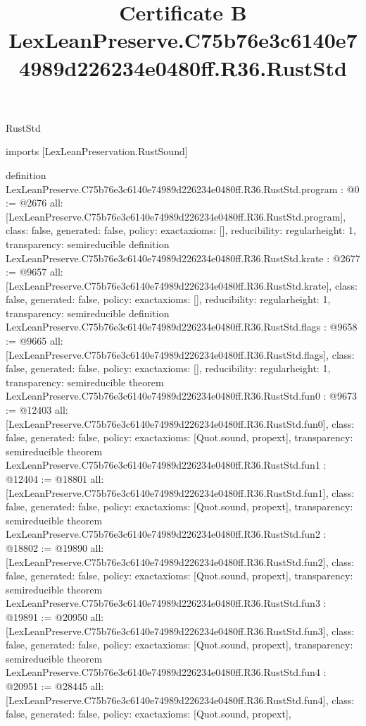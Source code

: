\begin{lexlean}{RustStd}
\title{Certificate B LexLeanPreserve.C75b76e3c6140e74989d226234e0480ff.R36.RustStd}
\begin{coremodule}
imports [LexLeanPreservation.RustSound]

definition LexLeanPreserve.C75b76e3c6140e74989d226234e0480ff.R36.RustStd.program : @0 := @2676 {
  all: [LexLeanPreserve.C75b76e3c6140e74989d226234e0480ff.R36.RustStd.program],
  class: false,
  generated: false,
  policy: exact{axioms: []},
  reducibility: regular{height: 1},
  transparency: semireducible
}
definition LexLeanPreserve.C75b76e3c6140e74989d226234e0480ff.R36.RustStd.krate : @2677 := @9657 {
  all: [LexLeanPreserve.C75b76e3c6140e74989d226234e0480ff.R36.RustStd.krate],
  class: false,
  generated: false,
  policy: exact{axioms: []},
  reducibility: regular{height: 1},
  transparency: semireducible
}
definition LexLeanPreserve.C75b76e3c6140e74989d226234e0480ff.R36.RustStd.flags : @9658 := @9665 {
  all: [LexLeanPreserve.C75b76e3c6140e74989d226234e0480ff.R36.RustStd.flags],
  class: false,
  generated: false,
  policy: exact{axioms: []},
  reducibility: regular{height: 1},
  transparency: semireducible
}
theorem LexLeanPreserve.C75b76e3c6140e74989d226234e0480ff.R36.RustStd.fun0 : @9673 := @12403 {
  all: [LexLeanPreserve.C75b76e3c6140e74989d226234e0480ff.R36.RustStd.fun0],
  class: false,
  generated: false,
  policy: exact{axioms: [Quot.sound, propext]},
  transparency: semireducible
}
theorem LexLeanPreserve.C75b76e3c6140e74989d226234e0480ff.R36.RustStd.fun1 : @12404 := @18801 {
  all: [LexLeanPreserve.C75b76e3c6140e74989d226234e0480ff.R36.RustStd.fun1],
  class: false,
  generated: false,
  policy: exact{axioms: [Quot.sound, propext]},
  transparency: semireducible
}
theorem LexLeanPreserve.C75b76e3c6140e74989d226234e0480ff.R36.RustStd.fun2 : @18802 := @19890 {
  all: [LexLeanPreserve.C75b76e3c6140e74989d226234e0480ff.R36.RustStd.fun2],
  class: false,
  generated: false,
  policy: exact{axioms: [Quot.sound, propext]},
  transparency: semireducible
}
theorem LexLeanPreserve.C75b76e3c6140e74989d226234e0480ff.R36.RustStd.fun3 : @19891 := @20950 {
  all: [LexLeanPreserve.C75b76e3c6140e74989d226234e0480ff.R36.RustStd.fun3],
  class: false,
  generated: false,
  policy: exact{axioms: [Quot.sound, propext]},
  transparency: semireducible
}
theorem LexLeanPreserve.C75b76e3c6140e74989d226234e0480ff.R36.RustStd.fun4 : @20951 := @28445 {
  all: [LexLeanPreserve.C75b76e3c6140e74989d226234e0480ff.R36.RustStd.fun4],
  class: false,
  generated: false,
  policy: exact{axioms: [Quot.sound, propext]},
}
\end{coremodule}
\end{lexlean}
